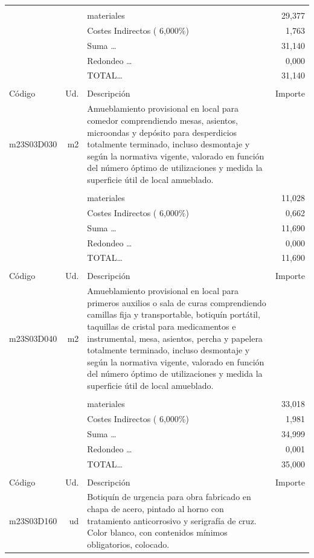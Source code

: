 \begin{supertabular}{l r p{60mm} r}
&&&\\%
&&materiales&    29,377\\%
&&Costes Indirectos (     6,000\%)&     1,763\\%
&&Suma \ldots&    31,140\\%
&&Redondeo \ldots&     0,000\\%
%
&&TOTAL\ldots&    31,140\\%
&&&\\%
Código&Ud.&Descripción&Importe\\%
\hline%
m23S03D030&m2&Amueblamiento provisional en local para comedor comprendiendo mesas, asientos, microondas y depósito para desperdicios totalmente terminado, incluso desmontaje y según la normativa vigente, valorado en función del número óptimo de utilizaciones y medida la superficie útil de local amueblado.&\\%
&&&\\%
&&materiales&    11,028\\%
&&Costes Indirectos (     6,000\%)&     0,662\\%
&&Suma \ldots&    11,690\\%
&&Redondeo \ldots&     0,000\\%
%
&&TOTAL\ldots&    11,690\\%
&&&\\%
Código&Ud.&Descripción&Importe\\%
\hline%
m23S03D040&m2&Amueblamiento provisional en local para primeros auxilios o sala de curas comprendiendo camillas fija y transportable, botiquín portátil, taquillas de cristal para medicamentos e instrumental, mesa, asientos, percha y papelera totalmente terminado, incluso desmontaje y según la normativa vigente, valorado en función del número óptimo de utilizaciones y medida la superficie útil de local amueblado.&\\%
&&&\\%
&&materiales&    33,018\\%
&&Costes Indirectos (     6,000\%)&     1,981\\%
&&Suma \ldots&    34,999\\%
&&Redondeo \ldots&     0,001\\%
%
&&TOTAL\ldots&    35,000\\%
&&&\\%
Código&Ud.&Descripción&Importe\\%
\hline%
m23S03D160&ud&Botiquín de urgencia para obra fabricado en chapa de acero, pintado al horno con tratamiento anticorrosivo y serigrafía de cruz. Color blanco, con contenidos mínimos obligatorios, colocado.&\\%

\end{supertabular}
